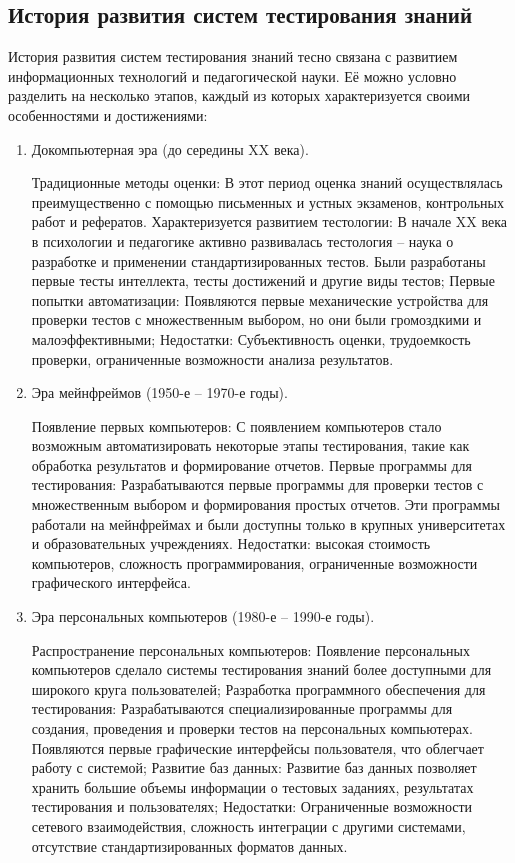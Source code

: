 \subsection{История развития систем тестирования знаний}

История развития систем тестирования знаний тесно связана с развитием информационных технологий и педагогической науки. Её можно условно разделить на несколько этапов, каждый из которых характеризуется своими особенностями и достижениями:

\begin{enumerate}
	\item Докомпьютерная эра (до середины XX века).
	
	Традиционные методы оценки: В этот период оценка знаний осуществлялась преимущественно с помощью письменных и устных экзаменов, контрольных работ и рефератов.
	Характеризуется развитием тестологии: В начале XX века в психологии и педагогике активно развивалась тестология – наука о разработке и применении стандартизированных тестов. Были разработаны первые тесты интеллекта, тесты достижений и другие виды тестов;
	Первые попытки автоматизации: Появляются первые механические устройства для проверки тестов с множественным выбором, но они были громоздкими и малоэффективными;
	Недостатки: Субъективность оценки, трудоемкость проверки, ограниченные возможности анализа результатов.
	
	\item Эра мейнфреймов (1950-е – 1970-е годы).
	
	Появление первых компьютеров: С появлением компьютеров стало возможным автоматизировать некоторые этапы тестирования, такие как обработка результатов и формирование отчетов.
	Первые программы для тестирования: Разрабатываются первые программы для проверки тестов с множественным выбором и формирования простых отчетов. Эти программы работали на мейнфреймах и были доступны только в крупных университетах и образовательных учреждениях.
	Недостатки: высокая стоимость компьютеров, сложность программирования, ограниченные возможности графического интерфейса.
	
	\item Эра персональных компьютеров (1980-е – 1990-е годы).
	
	Распространение персональных компьютеров: Появление персональных компьютеров сделало системы тестирования знаний более доступными для широкого круга пользователей;
	Разработка программного обеспечения для тестирования: Разрабатываются специализированные программы для создания, проведения и проверки тестов на персональных компьютерах. Появляются первые графические интерфейсы пользователя, что облегчает работу с системой;
	Развитие баз данных: Развитие баз данных позволяет хранить большие объемы информации о тестовых заданиях, результатах тестирования и пользователях;
	Недостатки: Ограниченные возможности сетевого взаимодействия, сложность интеграции с другими системами, отсутствие стандартизированных форматов данных.
	


\end{enumerate}
